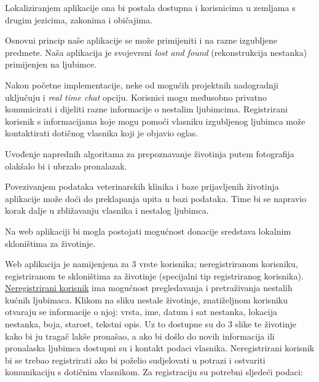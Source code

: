 		\begin{packed_item}
		
			\item Lokaliziranjem aplikacije ona bi postala dostupna i korisnicima u zemljama s drugim jezicima, zakonima i običajima.
			
			\item Osnovni princip naše aplikacije se može primijeniti i na razne izgubljene predmete. Naša aplikacija je svojevrsni \textit{lost and found} (rekonstrukcija nestanka) primijenjen na ljubimce.
			
			\item Nakon početne implementacije, neke od mogućih projektnih nadogradnji uključuju i \textit{real time chat} opciju. Korisnici mogu međusobno privatno komunicirati i dijeliti razne informacije o nestalim ljubimcima. Registrirani korisnik s informacijama koje mogu pomoći vlasniku izgubljenog ljubimca može kontaktirati dotičnog vlasnika koji je objavio oglas.
			
			\item Uvođenje naprednih algoritama za prepoznavanje životinja putem fotografija olakšalo bi i ubrzalo pronalazak.
			
			\item Povezivanjem podataka veterinarskih klinika i baze prijavljenih životinja aplikacije može doći do preklapanja upita u bazi podataka. Time bi se napravio korak dalje u zbližavanju vlasnika i nestalog ljubimca.
			
			\item Na web aplikaciji bi mogla postojati mogućnost donacije sredstava lokalnim skloništima za životinje.\\
			
		\end{packed_item}
		
		Web aplikacija je namijenjena za 3 vrste korisnika; neregistriranom korisniku, registriranom te skloništima za životinje (specijalni tip registriranog korisnika).\\
		
		\underline{Neregistrirani korisnik} ima mogućnost pregledavanja i pretraživanja nestalih kućnih ljubimaca. Klikom na sliku nestale životinje, znatiželjnom korisniku otvaraju se informacije o njoj: vrsta, ime, datum i sat nestanka, lokacija nestanka, boja, starost, tekstni opis. Uz to dostupne su do 3 slike te životinje kako bi ju tragač lakše pronašao, a ako bi došlo do novih informacija ili pronalaska ljubimca dostupni su i kontakt podaci vlasnika. Neregistrirani korisnik bi se trebao registrirati ako bi poželio sudjelovati u potrazi i ostvariti komunikaciju s dotičnim vlasnikom. Za registraciju su potrebni sljedeći podaci:
		
